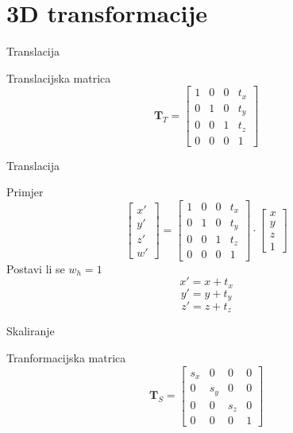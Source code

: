 \documentclass[9pt]{beamer}
\begin{document}
\section{3D transformacije}
\begin{frame}{Translacija}
	\begin{block}{Translacijska matrica}
		\[    \mathbf{T}_{T} = \left[ \begin{array}{cccc}
		1 & 0 & 0 & t_{x} \\
		0 & 1 & 0 & t_{y} \\
		0 & 0 & 1 & t_{z} \\
		0 & 0 & 0 & 1 
		\end{array} \right] \]
	\end{block}
\end{frame}
\begin{frame}{Translacija}
	\begin{block}{Primjer}
		\[    \left[ \begin{array}{c}
		x' \\ y' \\ z'\\ w'
		\end{array} \right] =  
		\left[ \begin{array}{cccc}
		1 & 0 & 0 & t_{x} \\
		0 & 1 & 0 & t_{y} \\
		0 & 0 & 1 & t_{z} \\
		0 & 0 & 0 & 1 
		\end{array} \right] \cdotp 
		\left[ \begin{array}{c}
		x \\ y \\ z\\ 1
		\end{array} \right]\]
		Postavi li se $ w_{h} = 1 $
		\[	x'= x+t_{x} \]
		\[	y'= y+t_{y} \]
		\[	z'= z+t_{z} \]
	\end{block}
\end{frame}

\begin{frame}{Skaliranje}
	\begin{block}{Tranformacijska matrica }
		\[    \mathbf{T}_{S} = \left[ \begin{array}{cccc}
		s_{x} & 0 & 0 & 0 \\
		0 & s_{y} & 0 & 0 \\
		0 & 0 & s_{z} & 0 \\
		0 & 0 & 0 & 1 
		\end{array} \right] \]
	\end{block}
\end{frame}
\end{document}
